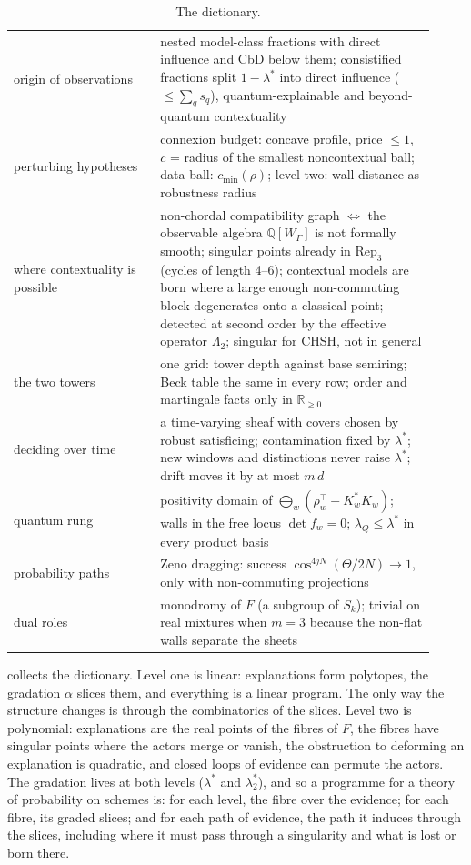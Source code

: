 \documentclass[11pt]{article}
\theoremstyle{definition}\newtheorem{definition}[theorem]{Definition}\newtheorem{remark}[theorem]{Remark}\newtheorem{example}[theorem]{Example}
\newcommand{\R}{\mathbb R}
\begin{document}
\begin{table}[!htbp]
\begin{tabular}{p{0.32\linewidth}p{0.6\linewidth}}
origin of observations & nested model-class fractions with direct influence and CbD below them; consistified fractions split $1-\lambda^*$ into direct influence ($\le\sum_qs_q$), quantum-explainable and beyond-quantum contextuality\\
perturbing hypotheses & connexion budget: concave profile, price $\le1$, $c$ = radius of the smallest noncontextual ball; data ball: $c_{\min}(\rho)$; level two: wall distance as robustness radius\\
where contextuality is possible & non-chordal compatibility graph $\Leftrightarrow$ the observable algebra $\mathbb Q[W_\Gamma]$ is not formally smooth; singular points already in $\mathrm{Rep}_3$ (cycles of length 4--6); contextual models are born where a large enough non-commuting block degenerates onto a classical point; detected at second order by the effective operator $\Lambda_2$; singular for CHSH, not in general\\
the two towers & one grid: tower depth against base semiring; Beck table the same in every row; order and martingale facts only in $\R_{\ge0}$\\
deciding over time & a time-varying sheaf with covers chosen by robust satisficing; contamination fixed by $\lambda^*$; new windows and distinctions never raise $\lambda^*$; drift moves it by at most $m\,d$\\
quantum rung & positivity domain of $\bigoplus_w(\rho_w^\top-K_w^*K_w)$; walls in the free locus $\det f_w=0$; $\lambda_Q\le\lambda^*$ in every product basis\\
probability paths & Zeno dragging: success $\cos^{4jN}(\Theta/2N)\to1$, only with non-commuting projections\\
dual roles & monodromy of $F$ (a subgroup of $S_k$); trivial on real mixtures when $m=3$ because the non-flat walls separate the sheets\\\bottomrule
\end{tabular}
\caption{The dictionary.}\label{tab:dict}
\end{table}

 collects the dictionary. Level one is linear: explanations form polytopes, the gradation $\alpha$ slices them, and
everything is a linear program. The only way the structure changes is through the combinatorics of the slices. Level two is polynomial:
explanations are the real points of the fibres of $F$, the fibres have singular points where the actors merge or vanish, the
obstruction to deforming an explanation is quadratic, and closed loops of evidence can permute the actors. The gradation lives at both
levels ($\lambda^*$ and $\lambda^*_2$), and so a programme for a theory of probability on schemes is: for each level, the fibre over the
evidence; for each fibre, its graded slices; and for each path of evidence, the path it induces through the slices, including where it
must pass through a singularity and what is lost or born there.
\end{document}
